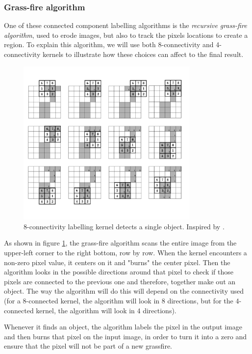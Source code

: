 {\subsubsection{Grass-fire algorithm}
One of these connected component labelling algorithms is the \textit{recursive grass-fire algorithm}, used to erode images, but also to track the pixels locations to create a region.
To explain this algorithm, we will use both 8-connectivity and 4-connectivity kernels to illustrate how these choices can affect to the final result.

\begin{figure}[htbp]
\centering
\includegraphics[width=0.8\textwidth]{Pictures/Theory/8connec_kernel.png}
\caption{8-connectivity labelling kernel detects a single object. Inspired by \citep{ip_book}.}
\label{fig:8connecK}
\end{figure}

As shown in figure \ref{fig:8connecK}, the grass-fire algorithm scans the entire image from the upper-left corner to the right bottom, row by row. When the kernel encounters a non-zero pixel value, it centers on it and "burns" the center pixel. Then the algorithm looks in the possible directions around that pixel to check if those pixels are connected to the previous one and therefore, together make out an object. The way the algorithm will do this will depend on the connectivity used (for a 8-connected kernel, the algorithm will look in 8 directions, but for the 4-connected kernel, the algorithm will look in 4 directions).

Whenever it finds an object, the algorithm labels the pixel in the output image and then burns that pixel on the input image, in order to turn it into a zero and ensure that the pixel will not be part of a new grassfire.

}
